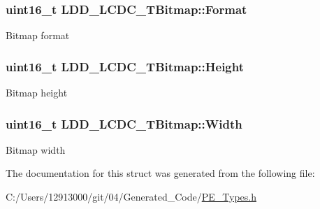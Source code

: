 \subsubsection[{Format}]{\setlength{\rightskip}{0pt plus 5cm}uint16\+\_\+t L\+D\+D\+\_\+\+L\+C\+D\+C\+\_\+\+T\+Bitmap\+::\+Format}\label{struct_l_d_d___l_c_d_c___t_bitmap_a8f886a6ce6e67d4b070c20bdd5ce495a}
Bitmap format \hypertarget{struct_l_d_d___l_c_d_c___t_bitmap_a13fea31674709c4f681e6c86d3b71206}{}
\subsubsection[{Height}]{\setlength{\rightskip}{0pt plus 5cm}uint16\+\_\+t L\+D\+D\+\_\+\+L\+C\+D\+C\+\_\+\+T\+Bitmap\+::\+Height}\label{struct_l_d_d___l_c_d_c___t_bitmap_a13fea31674709c4f681e6c86d3b71206}
Bitmap height \hypertarget{struct_l_d_d___l_c_d_c___t_bitmap_af88017bd29e49292265c1fda6dc5463d}{}
\subsubsection[{Width}]{\setlength{\rightskip}{0pt plus 5cm}uint16\+\_\+t L\+D\+D\+\_\+\+L\+C\+D\+C\+\_\+\+T\+Bitmap\+::\+Width}\label{struct_l_d_d___l_c_d_c___t_bitmap_af88017bd29e49292265c1fda6dc5463d}
Bitmap width 

The documentation for this struct was generated from the following file\+:\begin{DoxyCompactItemize}
\item 
C\+:/\+Users/12913000/git/04/\+Generated\+\_\+\+Code/\hyperlink{_p_e___types_8h}{P\+E\+\_\+\+Types.\+h}\end{DoxyCompactItemize}
